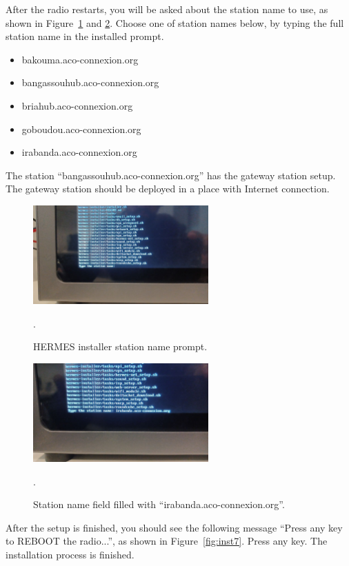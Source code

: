 \documentclass[11pt,a4paper]{article}
\begin{document}
After the radio restarts, you will be asked about the station name to use, as shown in Figure~\ref{fig:inst5} and \ref{fig:inst6}. Choose one of station
names below, by typing the full station name in the installed prompt.
\begin{itemize}
\item bakouma.aco-connexion.org
\item bangassouhub.aco-connexion.org
\item briahub.aco-connexion.org
\item goboudou.aco-connexion.org
\item irabanda.aco-connexion.org
\end{itemize}

The station ``bangassouhub.aco-connexion.org'' has the gateway station setup. The gateway station should be deployed
in a place with Internet connection.

\begin{figure}[H]
  \centering
  \includegraphics[width=0.6\textwidth]{pictures/inst-5.jpg}
  \caption{HERMES installer station name prompt.}.
  \label{fig:inst5}
\end{figure}

\begin{figure}[H]
  \centering
  \includegraphics[width=0.6\textwidth]{pictures/inst-6.jpg}
  \caption{Station name field filled with ``irabanda.aco-connexion.org''.}.
  \label{fig:inst6}
\end{figure}

After the setup is finished, you should see the following message ``Press any key to REBOOT the radio...'', as shown in Figure~\ref{fig:inst7}. Press any key. The installation process is finished.
\end{document}
